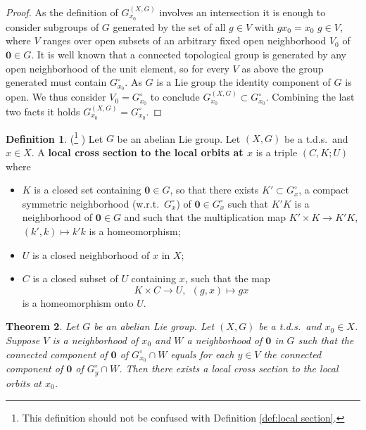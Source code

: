\documentclass[11pt]{article}
\theoremstyle{plain}
\newtheorem{thm}{Theorem}[section]
\theoremstyle{definition}
\newtheorem{defn}[thm]{Definition}
\numberwithin{figure}{section}
\begin{document}
\begin{proof}
    As the definition of $G_{x_0}^{(X,G)}$ involves an intersection it is enough to consider subgroups of $G$ generated by the set of all $g\in V$ with $gx_0=x_0$ $g\in V$, where $V$  ranges over open subsets of an arbitrary fixed open neighborhood $V_0$ of $\mathbf{0}\in G$. It is well known that a connected topological group is generated by any open neighborhood of the unit element, so for every $V$ as above the group generated must contain $G_{x_0}^\circ$.  As $G$ is a Lie group the identity component of $G$ is open. We thus consider $V_0=G_{x_0}^\circ$  to conclude  $G_{x_0}^{(X,G)}\subset G_{x_0}^\circ$. Combining the last two facts it holds  $G_{x_0}^{(X,G)}= G_{x_0}^\circ$.
\end{proof}
\begin{defn}\label{def:local cross section}(\cite[Appendix II, Definitions 1.10 \& 1.5 for certain t.d.s.]{HM66}\footnote{This definition should not be confused with Definition \ref{def:local section}.} )
Let $G$ be an abelian Lie group. Let $(X,G)$ be a t.d.s.\ and $x\in X$.  A \textbf{local cross section to the local orbits
at $x$} is a triple $(C, K; U)$ where 
\begin{itemize}
    \item 
$K$ is a closed set containing  $\mathbf{0}\in G$, so that there exists $K'\subset  G_{x}^\circ$, a compact symmetric
neighborhood (w.r.t.\ $ G_{x}^\circ$) of  $\mathbf{0}\in G_{x}^\circ$ such that $K'K$ is a neighborhood of $\mathbf{0}\in G$ and such that the multiplication map $K'\times K\rightarrow K'K$, $(k',k)\mapsto k'k$ is a homeomorphism; 
\item 
 $U$ is a closed neighborhood of $x$ in $X$;
 \item 
 $C$ is a closed subset of $U$ containing $x$, such that the map 
\begin{equation}
        K\times C\to U,~~(g,x)\mapsto g x
    \end{equation}
    is a homeomorphism onto $U$.
\end{itemize}
 
\end{defn}

\begin{thm}\cite[Appendix II, Theorem 1.11 for certain t.d.s.]{HM66}\label{existence of local cross sections}
   Let $G$ be an abelian Lie group. Let $(X,G)$ be a t.d.s.\ and  $x_0\in X$. Suppose $V$ is a neighborhood of $x_0$ and $W$ a neighborhood of $\mathbf{0}$ in $G$ such that the connected component of $\mathbf{0}$ of $G_{x_0}^\circ \cap W$ equals  for each $y\in V$ the connected component of $\mathbf{0}$ of $G_y^\circ\cap W$. Then there exists a local cross section to the local orbits at $x_0$.
    
    \end{thm}
    
\end{document}
